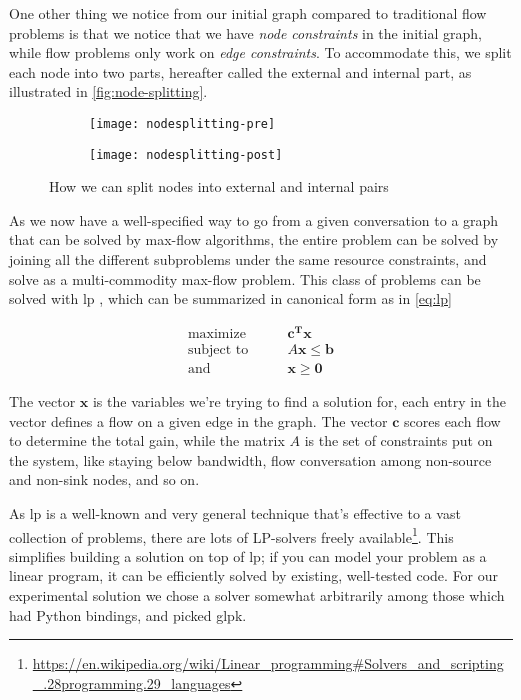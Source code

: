 One other thing we notice from our initial graph compared to traditional flow problems is that we notice that we have \emph{node constraints} in the initial graph, while flow problems only work on \emph{edge constraints}. To accommodate this, we split each node into two parts, hereafter called the external and internal part, as illustrated in \autoref{fig:node-splitting}.

\begin{figure}
    \centering
    \begin{subfigure}[t]{.48\textwidth}
        \centering
        \texttt{[image: nodesplitting-pre]}
    \end{subfigure}
    \hfill
    \begin{subfigure}[t]{.48\textwidth}
        \centering
        \texttt{[image: nodesplitting-post]}
    \end{subfigure}
    \caption{How we can split nodes into external and internal pairs}
    \label{fig:node-splitting}
\end{figure}

As we now have a well-specified way to go from a given conversation to a graph that can be solved by max-flow algorithms, the entire problem can be solved by joining all the different subproblems under the same resource constraints, and solve as a multi-commodity max-flow problem. This class of problems can be solved with \gls{lp} \cite{ahuja1988network}, which can be summarized in canonical form as in \autoref{eq:lp}

\begin{align}\label{eq:lp}
    \text{maximize}\qquad &\mathbf{c^Tx} \\
    \text{subject to}\qquad &A\mathbf{x} \leq \mathbf{b} \nonumber \\
    \text{and}\qquad &\mathbf{x} \geq \mathbf{0} \nonumber
\end{align}

The vector $\mathbf{x}$ is the variables we're trying to find a solution for, each entry in the vector defines a flow on a given edge in the graph. The vector $\mathbf{c}$ scores each flow to determine the total gain, while the matrix $A$ is the set of constraints put on the system, like staying below bandwidth, flow conversation among non-source and non-sink nodes, and so on.

As \gls{lp} is a well-known and very general technique that's effective to a vast collection of problems, there are lots of LP-solvers freely available\footnote{\url{https://en.wikipedia.org/wiki/Linear_programming\#Solvers_and_scripting_.28programming.29_languages}}. This simplifies building a solution on top of \gls{lp}; if you can model your problem as a linear program, it can be efficiently solved by existing, well-tested code. For our experimental solution we chose a solver somewhat arbitrarily among those which had Python bindings, and picked \gls{glpk}.


